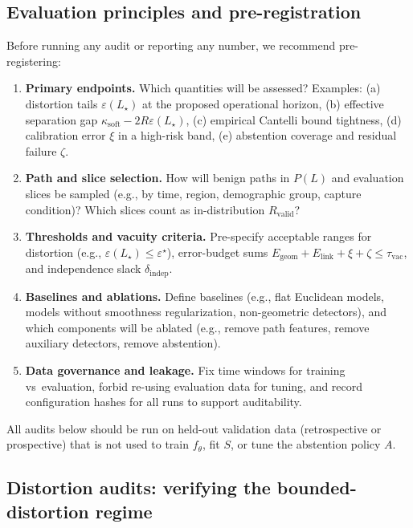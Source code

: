 \documentclass[11pt]{article}
\begin{document}
\subsection{Evaluation principles and pre-registration}

Before running any audit or reporting any number, we recommend pre-registering:

\begin{enumerate}[label=(\roman*)]
\item \textbf{Primary endpoints.} Which quantities will be assessed? Examples:
  (a) distortion tails $\varepsilon(L_\star)$ at the proposed operational horizon,
  (b) effective separation gap $\kappa_{\mathrm{soft}} - 2R\varepsilon(L_\star)$,
  (c) empirical Cantelli bound tightness, (d) calibration error $\xi$ in a high-risk
  band, (e) abstention coverage and residual failure $\zeta$.
\item \textbf{Path and slice selection.} How will benign paths in $P(L)$ and
  evaluation slices be sampled (e.g., by time, region, demographic group,
  capture condition)? Which slices count as in-distribution $R_{\mathrm{valid}}$?
\item \textbf{Thresholds and vacuity criteria.} Pre-specify acceptable ranges
  for distortion (e.g., $\varepsilon(L_\star) \le \varepsilon^\star$), error-budget
  sums $E_{\mathrm{geom}} + E_{\mathrm{link}} + \xi + \zeta \le \tau_{\mathrm{vac}}$,
  and independence slack $\delta_{\mathrm{indep}}$.
\item \textbf{Baselines and ablations.} Define baselines (e.g., flat Euclidean
  models, models without smoothness regularization, non-geometric detectors),
  and which components will be ablated (e.g., remove path features,
  remove auxiliary detectors, remove abstention).
\item \textbf{Data governance and leakage.} Fix time windows for training vs\
  evaluation, forbid re-using evaluation data for tuning, and record configuration
  hashes for all runs to support auditability.
\end{enumerate}

All audits below should be run on held-out validation data (retrospective or
prospective) that is not used to train $f_\theta$, fit $S$, or tune the abstention
policy $A$.

\subsection{Distortion audits: verifying the bounded-distortion regime}
\end{document}
